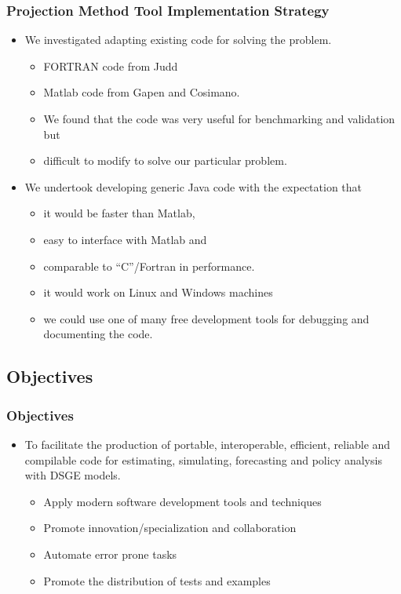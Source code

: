 \documentclass[tikz]{beamer}
\begin{document}
\begin{frame}
  \frametitle{Projection Method Tool Implementation Strategy}

\begin{itemize}
\item We investigated adapting existing code for solving the problem.
  \begin{itemize}
\item FORTRAN code from Judd 
\item  Matlab code from Gapen and Cosimano. 
\item We found that the code was very useful for benchmarking and validation but \item difficult to modify to solve our particular problem.
\end{itemize}
  \end{itemize}

\begin{itemize}
\item We undertook developing generic Java code with the expectation that 
  \begin{itemize}
  \item 
it would be faster than Matlab,
\item easy to interface with Matlab and
\item  comparable to ``C''/Fortran in performance.
\item it would work on Linux and Windows machines
\item we could use one of many free development tools 
for debugging and documenting the code.
  \end{itemize}
\end{itemize}



\end{frame}

  


\subsection{Objectives}

\begin{frame}
  \frametitle{Objectives}  

{%
\begin{itemize}
\item To facilitate  
the production of  portable, interoperable, efficient, 
 reliable and compilable code  for estimating,  
simulating,  forecasting and  policy analysis with
DSGE models.
  \begin{itemize}
  \item Apply modern software development tools and techniques
  \item Promote innovation/specialization and collaboration 
  \item Automate error prone tasks
  \item Promote the distribution of tests and examples
  \end{itemize}
\end{itemize}
}
\end{frame}
\end{document}
